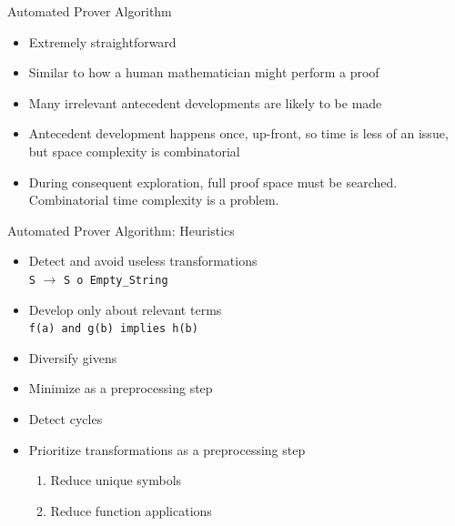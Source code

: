 \begin{frame}{Automated Prover Algorithm}
	\begin{itemize}
		\item Extremely straightforward
		\item Similar to how a human mathematician might perform a proof
		\item Many irrelevant antecedent developments are likely to be made
		\item Antecedent development happens once, up-front, so time is less of an issue, but space complexity is combinatorial
		\item During consequent exploration, full proof space must be searched.  Combinatorial time complexity is a problem.
	\end{itemize}
\end{frame}


\begin{frame}{Automated Prover Algorithm: Heuristics}
	\begin{itemize}
		\item Detect and avoid useless transformations\\
			\texttt{S} $\rightarrow$ \texttt{S o Empty\_String}
		\item Develop only about relevant terms\\
			\texttt{f(a) and g(b) implies h(b)}
		\item Diversify givens
		\item Minimize as a preprocessing step
		\item Detect cycles
		\item Prioritize transformations as a preprocessing step\\
			\begin{enumerate}
				\item Reduce unique symbols
				\item Reduce function applications
			\end{enumerate}
	\end{itemize}
\end{frame}


